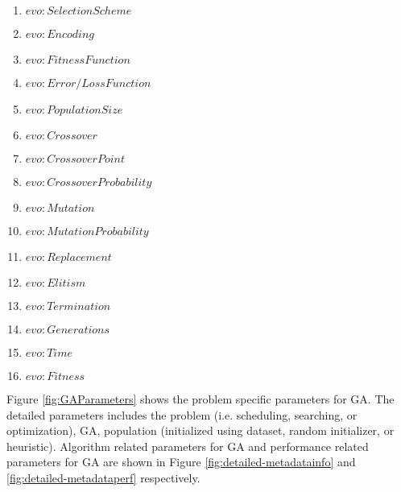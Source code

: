 \documentclass[preprint,12pt]{elsarticle}
\begin{document}
\begin{enumerate}[noitemsep]
  \item $evo:SelectionScheme$
  \item $evo:Encoding$
  \item $evo:FitnessFunction$
  \item $evo:Error/Loss Function$
  \item $evo:PopulationSize$
  \item $evo:Crossover$
  \item $evo:CrossoverPoint$
  \item $evo:CrossoverProbability$
  \item $evo:Mutation$
  \item $evo:MutationProbability$
  \item $evo:Replacement$
  \item $evo:Elitism$
  \item $evo:Termination$
  \item $evo:Generations$
  \item $evo:Time$
  \item $evo:Fitness$
\end{enumerate}


Figure \ref{fig:GAParameters} shows the problem specific parameters for GA. The detailed parameters includes the problem (i.e. scheduling, searching, or optimization), GA, population (initialized using dataset, random initializer, or heuristic). Algorithm related parameters for GA and performance related parameters for GA are shown in Figure \ref{fig:detailed-metadatainfo} and \ref{fig:detailed-metadataperf} respectively. 
\end{document}
